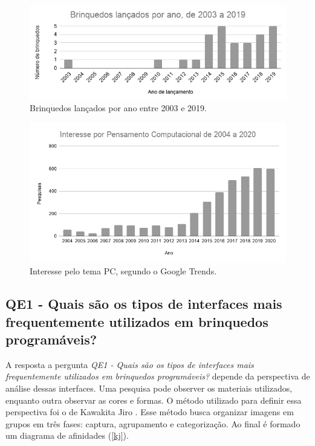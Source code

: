 {\begin{figure}[!htbp]
    \centering
    \includegraphics[width=.8\linewidth,fbox]{figs/brinquedos_ano.png}
    \caption{Brinquedos lançados por ano entre 2003 e 2019.}
    \label{toys_year}
    \sourceauthor
\end{figure}

\begin{figure}[!htbp]
    \centering
    \includegraphics[width=.8\linewidth,fbox]{figs/pc_interest.png}
    \caption{Interesse pelo tema \acl{PC}, segundo o Google Trends.}
    \label{pc_interest}
    \sourceauthor
\end{figure}

\subsection{QE1 - Quais são os tipos de interfaces mais frequentemente utilizados em brinquedos programáveis?}

A resposta a pergunta \textit{QE1 - Quais são os tipos de interfaces mais frequentemente utilizados em brinquedos programáveis?} depende da perspectiva de análise dessas interfaces. Uma pesquisa pode observer os materiais utilizados, enquanto outra observar as cores e formas. O método utilizado para definir essa perspectiva foi o de Kawakita Jiro . Esse método busca organizar imagens em grupos em três fases: captura, agrupamento e categorização. Ao final é formado um diagrama de afinidades (\autoref{kj}).

}
